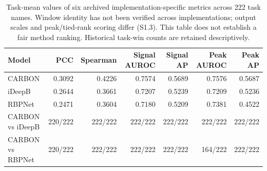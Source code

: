 \begin{table}[H]
\centering
\caption{Task-mean values of six archived implementation-specific metrics across 222 task names. Window identity has not been verified across implementations; output scales and peak/tied-rank scoring differ (S1.3). This table does not establish a fair method ranking. Historical task-win counts are retained descriptively.}
\label{tab:s1-benchmark}
\small
\setlength{\tabcolsep}{4pt}
\begin{tabular}{@{}lrrrrrr@{}}
\toprule
Model & PCC & Spearman & Signal AUROC & Signal AP & Peak AUROC & Peak AP \\
\midrule
CARBON & 0.3092 & 0.4226 & 0.7574 & 0.5689 & 0.7576 & 0.5687 \\
iDeepB & 0.2644 & 0.3661 & 0.7207 & 0.5239 & 0.7209 & 0.5236 \\
RBPNet & 0.2471 & 0.3604 & 0.7180 & 0.5209 & 0.7381 & 0.4522 \\
\midrule
CARBON vs iDeepB & 220/222 & 222/222 & 222/222 & 222/222 & 222/222 & 222/222 \\
CARBON vs RBPNet & 220/222 & 222/222 & 222/222 & 222/222 & 164/222 & 222/222 \\
\bottomrule
\end{tabular}
\end{table}
